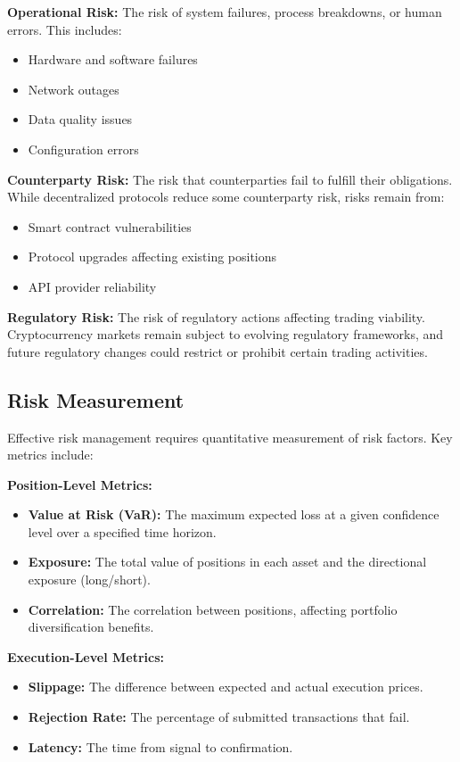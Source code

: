 \documentclass[12pt,a4paper]{article}
\begin{document}
\textbf{Operational Risk:} The risk of system failures, process breakdowns, or human errors. This includes:
\begin{itemize}
\item Hardware and software failures
\item Network outages
\item Data quality issues
\item Configuration errors
\end{itemize}

\textbf{Counterparty Risk:} The risk that counterparties fail to fulfill their obligations. While decentralized protocols reduce some counterparty risk, risks remain from:
\begin{itemize}
\item Smart contract vulnerabilities
\item Protocol upgrades affecting existing positions
\item API provider reliability
\end{itemize}

\textbf{Regulatory Risk:} The risk of regulatory actions affecting trading viability. Cryptocurrency markets remain subject to evolving regulatory frameworks, and future regulatory changes could restrict or prohibit certain trading activities.

\subsection{Risk Measurement}

Effective risk management requires quantitative measurement of risk factors. Key metrics include:

\textbf{Position-Level Metrics:}
\begin{itemize}
\item \textbf{Value at Risk (VaR):} The maximum expected loss at a given confidence level over a specified time horizon.
\item \textbf{Exposure:} The total value of positions in each asset and the directional exposure (long/short).
\item \textbf{Correlation:} The correlation between positions, affecting portfolio diversification benefits.
\end{itemize}

\textbf{Execution-Level Metrics:}
\begin{itemize}
\item \textbf{Slippage:} The difference between expected and actual execution prices.
\item \textbf{Rejection Rate:} The percentage of submitted transactions that fail.
\item \textbf{Latency:} The time from signal to confirmation.
\end{itemize}
\end{document}

